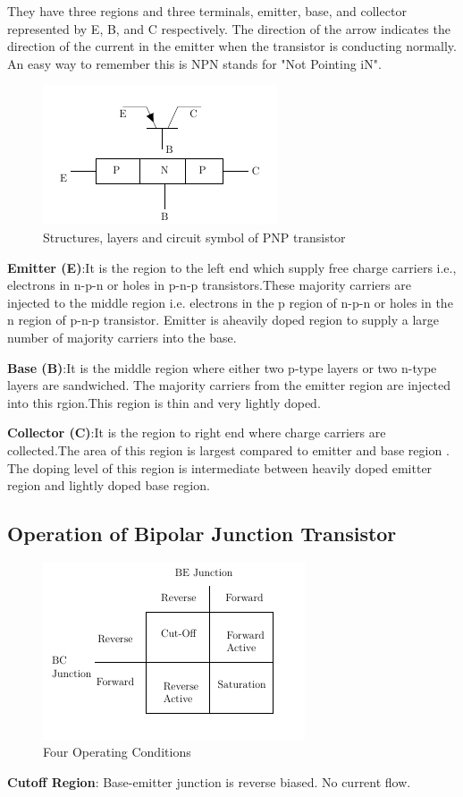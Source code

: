 			They have three regions and three terminals, emitter, base, and collector represented by E, B, and C respectively. The direction of the arrow indicates the direction of the current in the emitter when the transistor is conducting normally. An easy way to remember this is NPN stands for "Not Pointing iN".
			\begin{figure}[h]
				\centering
				\includegraphics[width=0.5\linewidth]{img/exp10/2}
				\caption{Structures, layers and circuit symbol of PNP transistor}
				\label{fig:bjt2_pnp}
			\end{figure}
			
			\textbf{Emitter (E)}:It is the region to the left end which supply free charge carriers i.e., electrons in n-p-n or holes in p-n-p transistors.These majority carriers are injected to the middle region i.e. electrons in the p region of n-p-n or holes in the n region of p-n-p transistor. Emitter is aheavily doped region to supply a large number of majority carriers into the base.
			
			\textbf{Base (B)}:It is the middle region where either two p-type layers or two n-type layers are sandwiched. The majority carriers from the emitter region are injected into this rgion.This region is thin and very lightly doped.
			
			\textbf{Collector (C)}:It is the region to right end where charge carriers are collected.The area of this region is largest compared to emitter and base region . The doping level of this region is intermediate between heavily doped emitter region and lightly doped base region.
			
		\subsection{Operation of Bipolar Junction Transistor}
			\begin{figure}[h]
				\centering
				\includegraphics[width=0.7\linewidth]{img/exp10/3}
				\caption{Four Operating Conditions}
				\label{fig:bjt2_ops_conditions}
			\end{figure}
			\textbf{Cutoff Region}: Base-emitter junction is reverse biased. No current flow.
			
